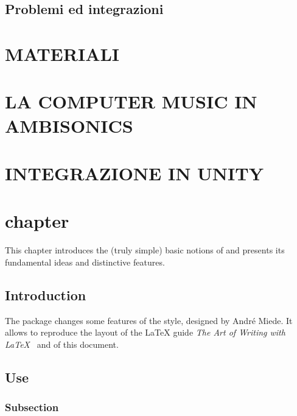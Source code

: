 \section{Problemi ed integrazioni}

\chapter{MATERIALI}
\label{chp:Materiali}

\chapter{LA COMPUTER MUSIC IN AMBISONICS}
\label{chp:La computer music in Ambisonics}

\chapter{INTEGRAZIONE IN UNITY}
\label{chp:Intergrazione in Unity}

\chapter{chapter}
\label{chp:chapter}

This chapter introduces the (truly simple) basic notions of \arsclassica{} and presents its fundamental ideas and distinctive features.

\section{Introduction}

The \arsclassica{} package changes some features of the \classicthesis{} style, designed by Andr\'e Miede. It allows to reproduce the layout of the \LaTeX{} guide \emph{The Art of Writing with \LaTeX}~\parencite{pantieri:arte} and of this document.

\section{Use}

\subsection*{Subsection}

